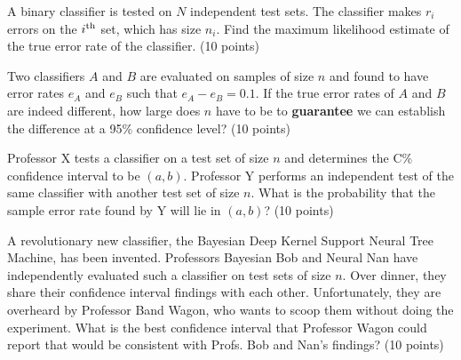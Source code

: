 \documentclass[fleqn]{homework}
\begin{document}
  \maketitle

  \begin{problem}{1}
    \begin{question}
      A binary classifier is tested on $N$ independent test sets.  The
      classifier makes $r_i$ errors on the $i\textsuperscript{th}$ set, which
      has size $n_i$.  Find the maximum likelihood estimate of the true error
      rate of the classifier. (10 points)
    \end{question}
  \end{problem}

  \begin{problem}{2}
    \begin{question}
      Two classifiers $A$ and $B$ are evaluated on samples of size $n$ and found
      to have error rates $e_A$ and $e_B$ such that $e_A - e_B = 0.1$.  If the
      true error rates of $A$ and $B$ are indeed different, how large does $n$
      have to be to \textbf{guarantee} we can establish the difference at a 95\%
      confidence level? (10 points)
    \end{question}
  \end{problem}

  \begin{problem}{3}
    \begin{question}
      Professor X tests a classifier on a test set of size $n$ and determines
      the C\% confidence interval to be $(a,b)$.  Professor Y performs an
      independent test of the same classifier with another test set of size
      $n$.  What is the probability that the sample error rate found by Y will
      lie in $(a,b)$? (10 points)
    \end{question}
  \end{problem}

  \begin{problem}{4}
    \begin{question}
      A revolutionary new classifier, the Bayesian Deep Kernel Support Neural
      Tree Machine, has been invented.  Professors Bayesian Bob and Neural Nan
      have independently evaluated such a classifier on test sets of size $n$.
      Over dinner, they share their confidence interval findings with each
      other.  Unfortunately, they are overheard by Professor Band Wagon, who
      wants to scoop them without doing the experiment.  What is the best
      confidence interval that Professor Wagon could report that would be
      consistent with Profs. Bob and Nan's findings? (10 points)
    \end{question}
  \end{problem}
\end{document}
